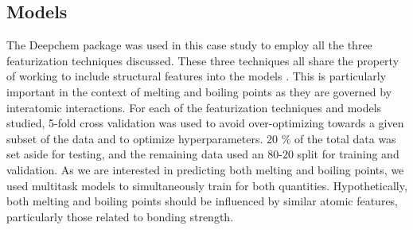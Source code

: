 \documentclass[book.tex]{subfiles}
\begin{document}





\subsection{Models} 
The Deepchem package \cite{ramsundar2019deep} was used in this case study to employ all the three featurization techniques discussed. These three techniques all share the property of working to include structural features into the models \cite{Wu2018MoleculeNet:Learning}. This is particularly important in the context of melting and boiling points as they are governed by interatomic interactions. For each of the featurization techniques and models studied, 5-fold cross validation was used to avoid over-optimizing towards a given subset of the data and to optimize hyperparameters. 20 \% of the total data was set aside for testing, and the remaining data used an 80-20 split for training and validation. As we are interested in predicting both melting and boiling points, we used multitask models to simultaneously train for both quantities. Hypothetically, both melting and boiling points should be influenced by similar atomic features, particularly those related to bonding strength. %
\end{document}
